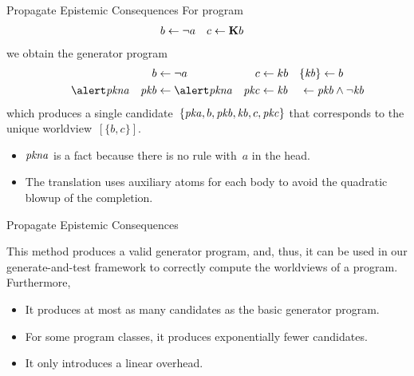 \documentclass[aspectratio=169,svgnames,xcolor=table,t]{beamer}
\begin{document}
\begin{frame}{Propagate Epistemic Consequences}
    For program
    \begin{align*}
        b &\leftarrow \neg a
        &
        c &\leftarrow \mathbf{K} b
    \end{align*}
    we obtain the generator program
    \begin{align*}
        &&
        b &\leftarrow \neg a
        &
        c &\leftarrow kb
        &
        \{ \kk{b} \} &\leftarrow b
        \\
        \hi{\kpnott{a}}&
        &
        \kp{b} &\leftarrow \hi{\kpnott{a}}
        &
        \kp{c} &\leftarrow \kk{b}
        &&
        \mathrlap{\hspace{-16pt}\leftarrow \kp{b} \wedge \neg \kk{b}}
    \end{align*}
    which produces a single candidate~$\{\mathit{pka},b,\mathit{pkb},\mathit{kb},c,\mathit{pkc}\}$ that corresponds to the unique worldview~$[\{b,c\}]$.

    \begin{itemize}
        \item $\mathit{pkna}$ is a fact because there is no rule with~$a$ in the head.
        \item The translation uses auxiliary atoms for each body to avoid the quadratic blowup of the completion.
    \end{itemize}
\end{frame}
\begin{frame}[c]{Propagate Epistemic Consequences}
    \begin{theorem}
        This method produces a valid generator program, and, thus, it can be used in our generate-and-test framework to correctly compute the worldviews of a program.
        \\
        Furthermore,
        \begin{itemize}
            \item It produces at most as many candidates as the basic generator program.
            \item For some program classes, it produces exponentially fewer candidates.
            \item It only introduces a linear overhead.
        \end{itemize}
    \end{theorem}
\end{frame}
\end{document}
